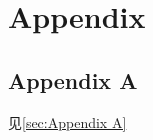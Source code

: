 \documentclass{hmj}
\begin{document}



\section{Appendix}
\subsection{Appendix A}\label{sec:Appendix A}
见\autoref{sec:Appendix A}



\end{document}
